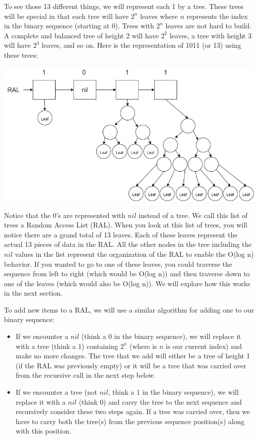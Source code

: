 \documentclass[
]{book}
\providecommand{\tightlist}{%
  \setlength{\itemsep}{0pt}\setlength{\parskip}{0pt}}
\begin{document}
To see those 13 different things, we will represent each 1 by a tree. These trees will be special in that each tree will have \(2^n\) leaves where \(n\) represents the index in the binary sequence (starting at 0). Trees with \(2^n\) leaves are not hard to build. A complete and balanced tree of height 2 will have \(2^2\) leaves, a tree with height 3 will have \(2^3\) leaves, and so on. Here is the representation of 1011 (or 13) using these trees:

\includegraphics{images/ral13.drawio.png}

Notice that the 0's are represented with \(nil\) instead of a tree. We call this list of trees a Random Access List (RAL). When you look at this list of trees, you will notice there are a grand total of 13 leaves. Each of these leaves represent the actual 13 pieces of data in the RAL. All the other nodes in the tree including the \(nil\) values in the list represent the organization of the RAL to enable the O(log n) behavior. If you wanted to go to one of these leaves, you could traverse the sequence from left to right (which would be O(log n)) and then traverse down to one of the leaves (which would also be O(log n)). We will explore how this works in the next section.

To add new items to a RAL, we will use a similar algorithm for adding one to our binary sequence:

\begin{itemize}
\tightlist
\item
  If we encounter a \(nil\) (think a 0 in the binary sequence), we will replace it with a tree (think a 1) containing \(2^n\) (where is \(n\) is our current index) and make no more changes. The tree that we add will either be a tree of height 1 (if the RAL was previously empty) or it will be a tree that was carried over from the recursive call in the next step below.
\item
  If we encounter a tree (not \(nil\), think a 1 in the binary sequence), we will replace it with a \(nil\) (think 0) and carry the tree to the next sequence and recursively consider these two steps again. If a tree was carried over, then we have to carry both the tree(s) from the previous sequence position(s) along with this position.
\end{itemize}
\end{document}
